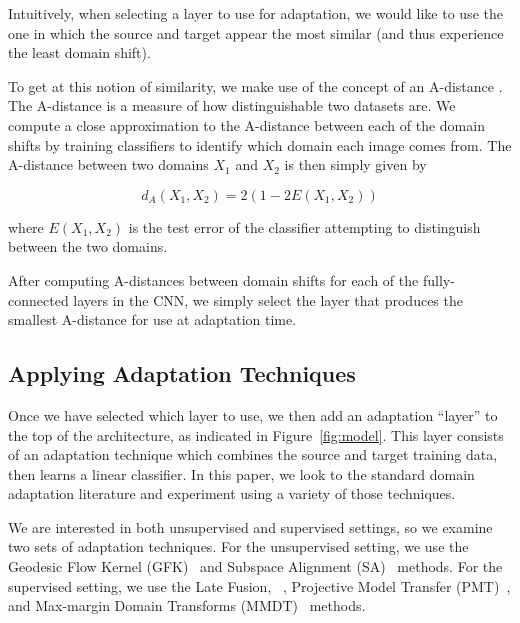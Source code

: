 Intuitively, when selecting a layer to use for adaptation, we would like to use
the one in which the source and target appear the most similar (and thus
experience the least domain shift).

To get at this notion of similarity, we make use of the concept of an A-distance
. The A-distance is a measure of how distinguishable
two datasets are. We compute a close approximation to the A-distance between
each of the domain shifts by training classifiers to identify which domain each
image comes from. The A-distance between two domains $X_1$ and $X_2$ is then
simply given by

\begin{equation}
  d_A(X_1, X_2) = 2 \left( 1 - 2E(X_1, X_2)\right)
\end{equation}


where $E(X_1, X_2)$ is the test error of the classifier attempting to
distinguish between the two domains.

After computing A-distances between domain shifts for each of the
fully-connected layers in the CNN, we simply select the layer that produces the
smallest A-distance for use at adaptation time.

\subsection{Applying Adaptation Techniques}

Once we have selected which layer to use, we then add an adaptation ``layer'' to
the top of the architecture, as indicated in Figure~\ref{fig:model}. This layer
consists of an adaptation technique which combines the source and target
training data, then learns a linear classifier. In this paper, we look to the
standard domain adaptation literature and experiment using a variety of those
techniques.

We are interested in both unsupervised and supervised settings, so we examine
two sets of adaptation techniques. For the unsupervised setting, we use the
Geodesic Flow Kernel (GFK)~\cite{gong-cvpr12} and Subspace Alignment
(SA)~\cite{sa} methods. For the supervised setting, we use the Late Fusion,
\daume~\cite{daume}, Projective Model Transfer (PMT)~\cite{aytar-iccv11}, and
Max-margin Domain Transforms (MMDT)~\cite{hoffman-iclr13} methods.
